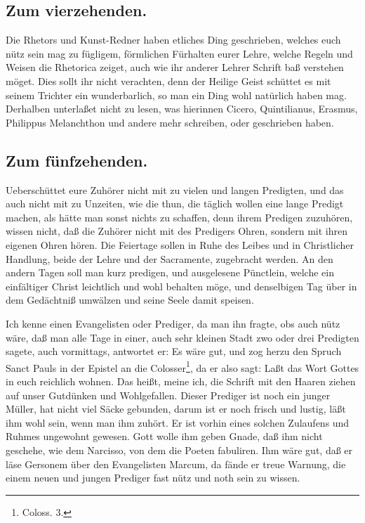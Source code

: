 \subsection*{Zum vierzehenden.}

Die Rhetors und Kunst-Redner haben etliches Ding geschrieben, welches euch nütz sein mag zu fügligem, förmlichen Fürhalten eurer Lehre, welche Regeln und Weisen die Rhetorica zeiget, auch wie ihr anderer Lehrer Schrift baß verstehen möget. Dies sollt ihr nicht verachten, denn der Heilige Geist schüttet es mit seinem Trichter ein wunderbarlich, so man ein Ding wohl natürlich haben mag. Derhalben unterlaßet nicht zu lesen, was hierinnen Cicero, Quintilianus, Erasmus, Philippus Melanchthon und andere mehr schreiben, oder geschrieben haben.

\subsection*{Zum fünfzehenden.}

Ueberschüttet eure Zuhörer nicht mit zu vielen und langen Predigten, und das auch nicht mit zu Unzeiten, wie die thun, die täglich wollen eine lange Predigt machen, als hätte man sonst nichts zu schaffen, denn ihrem Predigen zuzuhören, wissen nicht, daß die Zuhörer nicht mit des Predigers Ohren, sondern mit ihren eigenen Ohren hören. Die Feiertage sollen in Ruhe des Leibes und in Christlicher Handlung, beide der Lehre und der Sacramente, zugebracht werden. An den andern Tagen soll man kurz predigen, und ausgelesene Pünctlein, welche ein einfältiger Christ leichtlich und wohl behalten möge, und denselbigen Tag über in dem Gedächtniß umwälzen und seine Seele damit speisen.

Ich kenne einen Evangelisten oder Prediger, da man ihn fragte, obs auch nütz wäre, daß man alle Tage in einer, auch sehr kleinen Stadt zwo oder drei Predigten sagete, auch vormittags, antwortet er: Es wäre gut, und zog herzu den Spruch
Sanct Pauls in der Epistel an die Colosser\footnote{Coloss. 3.}, da er also sagt: Laßt das Wort Gottes in euch reichlich wohnen. Das heißt, meine ich, die Schrift mit den Haaren ziehen auf unser Gutdünken und Wohlgefallen. Dieser Prediger ist noch ein junger Müller, hat nicht viel Säcke gebunden, darum ist er noch frisch und lustig, läßt ihm wohl sein, wenn man ihm zuhört. Er ist vorhin eines solchen Zulaufens und Ruhmes ungewohnt gewesen. Gott wolle ihm geben Gnade, daß ihm nicht geschehe, wie dem Narcisso, von dem die Poeten fabuliren. Ihm wäre gut, daß er läse Gersonem über den Evangelisten Marcum, da fände er treue Warnung, die einem neuen und jungen Prediger fast nütz und noth sein zu wissen.

